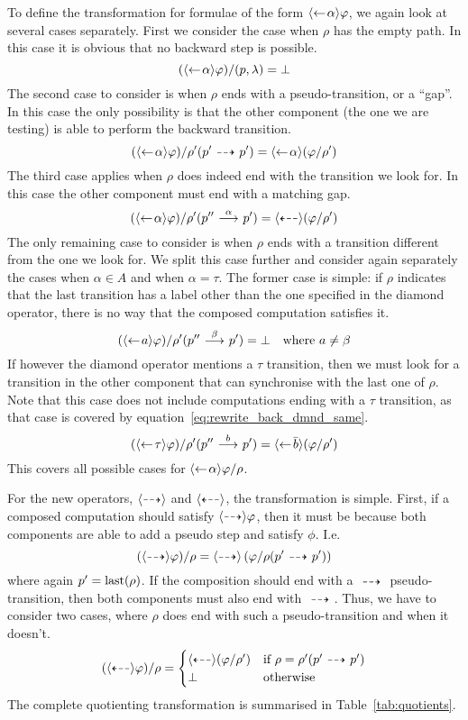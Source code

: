 To define the transformation for formulae of the form $\mbox{\ensuremath{\langle\leftarrow\! \alpha \rangle}}\varphi$, we
again look at several cases separately. First we consider the case when $\rho$ has
the empty path. In this case it is obvious that no backward step is possible.
\[
    (\mbox{\ensuremath{\langle\leftarrow\! \alpha \rangle}}\varphi) / (p,\lambda) = \bot
\]
The second case to consider is when $\rho$ ends with a pseudo-transition, or a ``gap''.
In this case the only possibility is that the other component (the one we are testing)
is able to perform the backward transition.
\[
    (\mbox{\ensuremath{\langle\leftarrow\! \alpha \rangle}}\varphi) / \rho'(p'\ {\stackrel{_{}}{\dashrightarrow}}\  p') =
        \mbox{\ensuremath{\langle\leftarrow\! \alpha \rangle}} (\varphi / \rho')
\]
The third case applies when $\rho$ does indeed end with the transition we look for.
In this case the other component must end with a matching gap.
\begin{equation}\label{eq:rewrite_back_dmnd_same}
    (\mbox{\ensuremath{\langle\leftarrow\! \alpha \rangle}}\varphi) / \rho'(p''\ {\stackrel{{\alpha}}{\longrightarrow}}\  p') = \mbox{\ensuremath{\langle\stackrel{_{}}{\dashleftarrow}\rangle}} (\varphi / \rho')
\end{equation}
The only remaining case to consider is when $\rho$ ends with a transition different from
the one we look for. We split this case further and consider
again separately the cases when $\alpha\in A$ and when $\alpha = \tau$. The former case
is simple: if $\rho$ indicates that the last transition has a label other than the one
specified
in the diamond operator, there is no way that the composed computation satisfies it.
\[
    (\mbox{\ensuremath{\langle\leftarrow\! a \rangle}}\varphi) / \rho'(p'' \ {\stackrel{{\beta}}{\longrightarrow}}\  p') = \bot \quad\textrm{where $a\ne \beta$}
\]
If however the diamond operator mentions a $\tau$ transition, then we must look for a
transition in the other component that can synchronise with the last one of $\rho$. Note that this
case does not include computations ending with a $\tau$ transition, as that case is
covered by equation~\ref{eq:rewrite_back_dmnd_same}.
\[
    (\mbox{\ensuremath{\langle\leftarrow\! \tau \rangle}}\varphi) / \rho'(p'' \ {\stackrel{{b}}{\longrightarrow}}\  p') = \mbox{\ensuremath{\langle\leftarrow\! \bar{b} \rangle}} (\varphi/\rho')
\]
This covers all possible cases for $\mbox{\ensuremath{\langle\leftarrow\! \alpha \rangle}}\varphi / \rho$.

For the new operators, $\mbox{\ensuremath{\langle\stackrel{_{}}{\dashrightarrow}\rangle}}$ and $\mbox{\ensuremath{\langle\stackrel{_{}}{\dashleftarrow}\rangle}}$, the transformation is simple.
First, if a composed computation should satisfy $\mbox{\ensuremath{\langle\stackrel{_{}}{\dashrightarrow}\rangle}}\varphi$, then it must be
because both components are able to add a pseudo step and satisfy $\phi$. I.e.
\[
    (\mbox{\ensuremath{\langle\stackrel{_{}}{\dashrightarrow}\rangle}}\varphi) / \rho = \mbox{\ensuremath{\langle\stackrel{_{}}{\dashrightarrow}\rangle}} \left( \varphi / \rho(p'\ {\stackrel{_{}}{\dashrightarrow}}\  p') \right)
\]
where again $p' = \operatorname{last}(\rho)$. If the composition should end with a $\ {\stackrel{_{}}{\dashrightarrow}}\ $
pseudo-transition, then both components must also end with $\ {\stackrel{_{}}{\dashrightarrow}}\ $. Thus, we
have to consider two cases, where $\rho$ does end with such a pseudo-transition
and when it doesn't.
\[
    (\mbox{\ensuremath{\langle\stackrel{_{}}{\dashleftarrow}\rangle}}\varphi) / \rho = \begin{cases}
        \mbox{\ensuremath{\langle\stackrel{_{}}{\dashleftarrow}\rangle}} (\varphi / \rho') & \textrm{if $\rho = \rho'(p' \ {\stackrel{_{}}{\dashrightarrow}}\  p')$} \\
        \bot & \textrm{otherwise}
    \end{cases}
\]
%
The complete quotienting transformation is summarised in Table~\ref{tab:quotients}.

